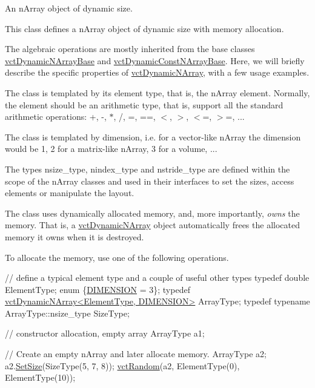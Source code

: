 An n\-Array object of dynamic size. 

This class defines a n\-Array object of dynamic size with memory allocation.

The algebraic operations are mostly inherited from the base classes \hyperlink{classvct_dynamic_n_array_base}{vct\-Dynamic\-N\-Array\-Base} and \hyperlink{classvct_dynamic_const_n_array_base}{vct\-Dynamic\-Const\-N\-Array\-Base}. Here, we will briefly describe the specific properties of \hyperlink{classvct_dynamic_n_array}{vct\-Dynamic\-N\-Array}, with a few usage examples.


\begin{DoxyEnumerate}
\item The class is templated by its element type, that is, the n\-Array element. Normally, the element should be an arithmetic type, that is, support all the standard arithmetic operations\-: +, -\/, $\ast$, /, =, ==, $<$, $>$, $<$=, $>$=, ... 
\item The class is templated by dimension, i.\-e. for a vector-\/like n\-Array the dimension would be 1, 2 for a matrix-\/like n\-Array, 3 for a volume, ... 
\item The types {\ttfamily nsize\-\_\-type}, {\ttfamily nindex\-\_\-type} and {\ttfamily nstride\-\_\-type} are defined within the scope of the n\-Array classes and used in their interfaces to set the sizes, access elements or manipulate the layout. 
\item The class uses dynamically allocated memory, and, more importantly, {\itshape owns} the memory. That is, a \hyperlink{classvct_dynamic_n_array}{vct\-Dynamic\-N\-Array} object automatically frees the allocated memory it owns when it is destroyed. 
\item To allocate the memory, use one of the following operations. 
\begin{DoxyCode}
\textcolor{comment}{// define a typical element type and a couple of useful other types}
\textcolor{keyword}{typedef} \textcolor{keywordtype}{double} ElementType;
\textcolor{keyword}{enum} \{\hyperlink{classvct_dynamic_n_array_base_aa66532d28588bdf26d08fb593db815d6abfcde386ec801b212d7c42d63a4f3837}{DIMENSION} = 3\};
\textcolor{keyword}{typedef} \hyperlink{classvct_dynamic_n_array}{vctDynamicNArray<ElementType, DIMENSION>} ArrayType;
\textcolor{keyword}{typedef} \textcolor{keyword}{typename} ArrayType::nsize\_type SizeType;

\textcolor{comment}{// constructor allocation, empty array}
ArrayType a1;

\textcolor{comment}{// Create an empty nArray and later allocate memory.}
ArrayType a2;
a2.\hyperlink{classvct_dynamic_n_array_a8f800ef9c9406b3fe6252348e3e30b95}{SetSize}(SizeType(5, 7, 8));
\hyperlink{group__cisst_vector_ga0d25660a2dc6ef9c093f6f6b2804d2d0}{vctRandom}(a2, ElementType(0), ElementType(10));


\end{DoxyCode}
\end{DoxyEnumerate}
